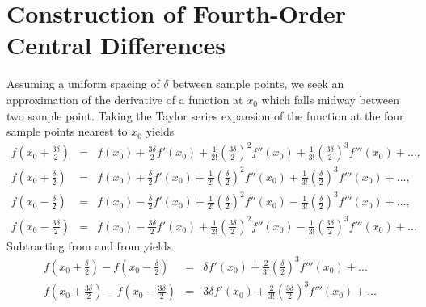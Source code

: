 \chapter{Construction of Fourth-Order Central Differences \label{ap:diff}}



Assuming a uniform spacing of $\delta$ between sample points, we seek
an approximation of the derivative of a function at $x_0$ which falls
midway between two sample point.  Taking the Taylor series expansion
of the function at the four sample points nearest to $x_0$ yields
\begin{eqnarray}
  f\!\left(x_0+\frac{3\delta}{2}\right) &=&
    f(x_0) + \frac{3\delta}{2} f'(x_0) +
        \frac{1}{2!}\left(\frac{3\delta}{2}\right)^2 f''(x_0) + 
        \frac{1}{3!}\left(\frac{3\delta}{2}\right)^3 f'''(x_0) + \ldots,
	\label{eq:fourI}
  \\
  f\!\left(x_0+\frac{\delta}{2}\right) &=&
    f(x_0) + \frac{\delta}{2} f'(x_0) +
        \frac{1}{2!}\left(\frac{\delta}{2}\right)^2 f''(x_0) + 
        \frac{1}{3!}\left(\frac{\delta}{2}\right)^3 f'''(x_0) + \ldots,
	\label{eq:fourII}
  \\
  f\!\left(x_0-\frac{\delta}{2}\right) &=&
    f(x_0) - \frac{\delta}{2} f'(x_0) +
        \frac{1}{2!}\left(\frac{\delta}{2}\right)^2 f''(x_0) -
        \frac{1}{3!}\left(\frac{\delta}{2}\right)^3 f'''(x_0) + \ldots,
	\label{eq:fourIII}
  \\
  f\!\left(x_0-\frac{3\delta}{2}\right) &=&
    f(x_0) - \frac{3\delta}{2} f'(x_0) +
        \frac{1}{2!}\left(\frac{3\delta}{2}\right)^2 f''(x_0) -
        \frac{1}{3!}\left(\frac{3\delta}{2}\right)^3 f'''(x_0) + \ldots
	\label{eq:fourIV}
\end{eqnarray}
Subtracting  from  and 
 from  yields
\begin{eqnarray}
  f\!\left(x_0+\frac{\delta}{2}\right) -
  f\!\left(x_0-\frac{\delta}{2}\right) &=& 
   \delta f'(x_0) +
        \frac{2}{3!}\left(\frac{\delta}{2}\right)^3 f'''(x_0) + \ldots
	\label{eq:inner}
  \\
  f\!\left(x_0+\frac{3\delta}{2}\right) -
  f\!\left(x_0-\frac{3\delta}{2}\right) &=& 
   3 \delta f'(x_0) +
        \frac{2}{3!}\left(\frac{3\delta}{2}\right)^3 f'''(x_0) + \ldots
	\label{eq:outer}
\end{eqnarray}
